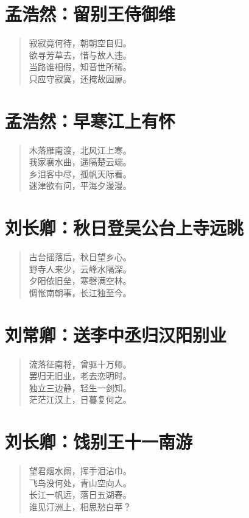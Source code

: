 \documentclass[12pt,oneside]{book}
\newenvironment{shici}{
\begin{verse}
\centering\large\hspace{12pt}}
{\end{verse}}
\begin{document}
\chapter{孟浩然：留别王侍御维}
\begin{shici}
寂寂竟何待，朝朝空自归。\\
欲寻芳草去，惜与故人违。\\
当路谁相假，知音世所稀。\\
只应守寂寞，还掩故园扉。
\end{shici}

\chapter{孟浩然：早寒江上有怀}
\begin{shici}
木落雁南渡，北风江上寒。\\
我家襄水曲，遥隔楚云端。\\
乡泪客中尽，孤帆天际看。\\
迷津欲有问，平海夕漫漫。
\end{shici}

\chapter{刘长卿：秋日登吴公台上寺远眺}
\begin{shici}
古台摇落后，秋日望乡心。\\
野寺人来少，云峰水隔深。\\
夕阳依旧垒，寒磬满空林。\\
惆怅南朝事，长江独至今。
\end{shici}

\chapter{刘常卿：送李中丞归汉阳别业}
\begin{shici}
流落征南将，曾驱十万师。\\
罢归无旧业，老去恋明时。\\
独立三边静，轻生一剑知。\\
茫茫江汉上，日暮复何之。
\end{shici}

\chapter{刘长卿：饯别王十一南游}
\begin{shici}
望君烟水阔，挥手泪沾巾。\\
飞鸟没何处，青山空向人。\\
长江一帆远，落日五湖春。\\
谁见汀洲上，相思愁白苹？
\end{shici}
\end{document}
